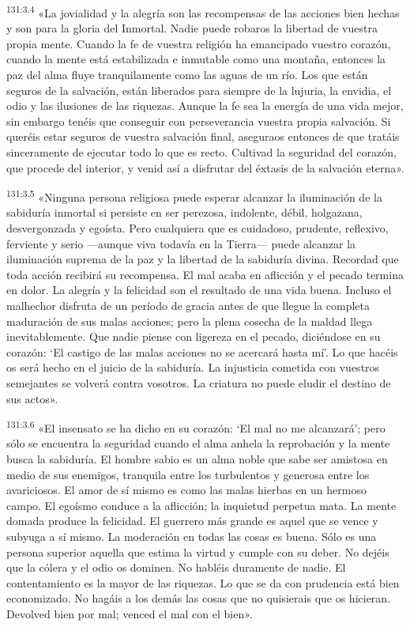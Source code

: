 \par 
\textsuperscript{131:3.4} «La jovialidad y la alegría son las recompensas de las acciones bien hechas y son para la gloria del Inmortal. Nadie puede robaros la libertad de vuestra propia mente. Cuando la fe de vuestra religión ha emancipado vuestro corazón, cuando la mente está estabilizada e inmutable como una montaña, entonces la paz del alma fluye tranquilamente como las aguas de un río. Los que están seguros de la salvación, están liberados para siempre de la lujuria, la envidia, el odio y las ilusiones de las riquezas. Aunque la fe sea la energía de una vida mejor, sin embargo tenéis que conseguir con perseverancia vuestra propia salvación. Si queréis estar seguros de vuestra salvación final, aseguraos entonces de que tratáis sinceramente de ejecutar todo lo que es recto. Cultivad la seguridad del corazón, que procede del interior, y venid así a disfrutar del éxtasis de la salvación eterna».

\par 
\textsuperscript{131:3.5} «Ninguna persona religiosa puede esperar alcanzar la iluminación de la sabiduría inmortal si persiste en ser perezosa, indolente, débil, holgazana, desvergonzada y egoísta. Pero cualquiera que es cuidadoso, prudente, reflexivo, ferviente y serio ---aunque viva todavía en la Tierra--- puede alcanzar la iluminación suprema de la paz y la libertad de la sabiduría divina. Recordad que toda acción recibirá su recompensa. El mal acaba en aflicción y el pecado termina en dolor. La alegría y la felicidad son el resultado de una vida buena. Incluso el malhechor disfruta de un período de gracia antes de que llegue la completa maduración de sus malas acciones; pero la plena cosecha de la maldad llega inevitablemente. Que nadie piense con ligereza en el pecado, diciéndose en su corazón: `El castigo de las malas acciones no se acercará hasta mí'. Lo que hacéis os será hecho en el juicio de la sabiduría. La injusticia cometida con vuestros semejantes se volverá contra vosotros. La criatura no puede eludir el destino de sus actos».

\par 
\textsuperscript{131:3.6} «El insensato se ha dicho en su corazón: `El mal no me alcanzará'; pero sólo se encuentra la seguridad cuando el alma anhela la reprobación y la mente busca la sabiduría. El hombre sabio es un alma noble que sabe ser amistosa en medio de sus enemigos, tranquila entre los turbulentos y generosa entre los avariciosos. El amor de sí mismo es como las malas hierbas en un hermoso campo. El egoísmo conduce a la aflicción; la inquietud perpetua mata. La mente domada produce la felicidad. El guerrero más grande es aquel que se vence y subyuga a sí mismo. La moderación en todas las cosas es buena. Sólo es una persona superior aquella que estima la virtud y cumple con su deber. No dejéis que la cólera y el odio os dominen. No habléis duramente de nadie. El contentamiento es la mayor de las riquezas. Lo que se da con prudencia está bien economizado. No hagáis a los demás las cosas que no quisierais que os hicieran. Devolved bien por mal; venced el mal con el bien».

